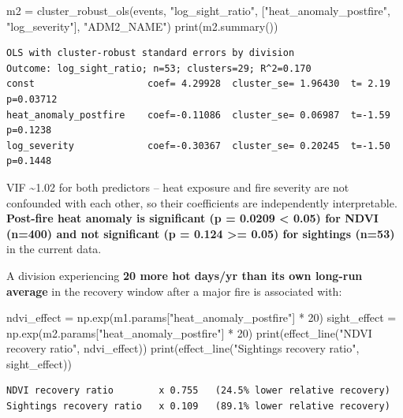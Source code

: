 \documentclass[
  letterpaper,
  DIV=11,
  numbers=noendperiod]{scrartcl}
\newenvironment{Shaded}{\begin{snugshade}}{\end{snugshade}}
\newcommand{\BuiltInTok}[1]{\textcolor[rgb]{0.00,0.23,0.31}{#1}}
\newcommand{\DecValTok}[1]{\textcolor[rgb]{0.68,0.00,0.00}{#1}}
\newcommand{\NormalTok}[1]{\textcolor[rgb]{0.00,0.23,0.31}{#1}}
\newcommand{\OperatorTok}[1]{\textcolor[rgb]{0.37,0.37,0.37}{#1}}
\newcommand{\StringTok}[1]{\textcolor[rgb]{0.13,0.47,0.30}{#1}}
\begin{document}
\begin{Shaded}
\begin{Highlighting}[]
\NormalTok{m2 }\OperatorTok{=}\NormalTok{ cluster\_robust\_ols(events, }\StringTok{"log\_sight\_ratio"}\NormalTok{,}
\NormalTok{                        [}\StringTok{"heat\_anomaly\_postfire"}\NormalTok{, }\StringTok{"log\_severity"}\NormalTok{], }\StringTok{"ADM2\_NAME"}\NormalTok{)}
\BuiltInTok{print}\NormalTok{(m2.summary())}
\end{Highlighting}
\end{Shaded}

\begin{verbatim}
OLS with cluster-robust standard errors by division
Outcome: log_sight_ratio; n=53; clusters=29; R^2=0.170
const                    coef= 4.29928  cluster_se= 1.96430  t= 2.19  p=0.03712
heat_anomaly_postfire    coef=-0.11086  cluster_se= 0.06987  t=-1.59  p=0.1238
log_severity             coef=-0.30367  cluster_se= 0.20245  t=-1.50  p=0.1448
\end{verbatim}

VIF \textasciitilde1.02 for both predictors -- heat exposure and fire
severity are not confounded with each other, so their coefficients are
independently interpretable. \textbf{Post-fire heat anomaly is
significant (p = 0.0209 \textless{} 0.05) for NDVI (n=400) and not
significant (p = 0.124 \textgreater= 0.05) for sightings (n=53)} in the
current data.

A division experiencing \textbf{20 more hot days/yr than its own
long-run average} in the recovery window after a major fire is
associated with:

\begin{Shaded}
\begin{Highlighting}[]
\NormalTok{ndvi\_effect }\OperatorTok{=}\NormalTok{ np.exp(m1.params[}\StringTok{"heat\_anomaly\_postfire"}\NormalTok{] }\OperatorTok{*} \DecValTok{20}\NormalTok{)}
\NormalTok{sight\_effect }\OperatorTok{=}\NormalTok{ np.exp(m2.params[}\StringTok{"heat\_anomaly\_postfire"}\NormalTok{] }\OperatorTok{*} \DecValTok{20}\NormalTok{)}
\BuiltInTok{print}\NormalTok{(effect\_line(}\StringTok{"NDVI recovery ratio"}\NormalTok{, ndvi\_effect))}
\BuiltInTok{print}\NormalTok{(effect\_line(}\StringTok{"Sightings recovery ratio"}\NormalTok{, sight\_effect))}
\end{Highlighting}
\end{Shaded}

\begin{verbatim}
NDVI recovery ratio        x 0.755   (24.5% lower relative recovery)
Sightings recovery ratio   x 0.109   (89.1% lower relative recovery)
\end{verbatim}
\end{document}
